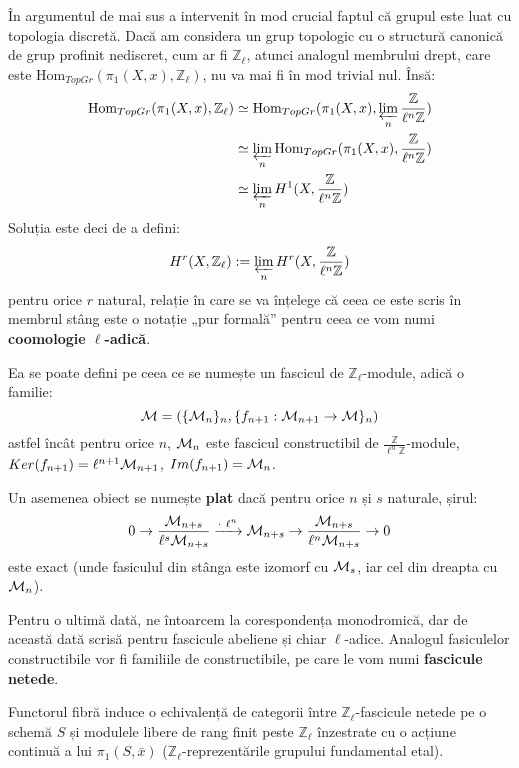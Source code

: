 \documentclass[13pt,openany]{book}
\begin{document}
În argumentul de mai sus a intervenit în mod crucial faptul că grupul este luat cu topologia discretă. Dacă am considera un grup topologic cu o structură canonică de grup profinit nediscret, cum ar fi $\mathbb{Z}_\ell$, atunci analogul membrului drept, care este $\text{Hom}_{TopGr}(\pi_1(X,x),\mathbb{Z}_\ell)$, nu va mai fi în mod trivial nul. Însă:
\begin{align*}
\text{Hom}_{TopGr}(\pi_1(X,x),\mathbb{Z}_\ell)&\simeq \text{Hom}_{TopGr}(\pi_1(X,x),\varprojlim_n \frac{\mathbb{Z}}{\ell^n\mathbb{Z}}) \\
&\simeq \varprojlim_n \text{Hom}_{TopGr}(\pi_1(X,x), \frac{\mathbb{Z}}{\ell^n\mathbb{Z}}) \\
&\simeq \varprojlim_n H^1(X, \frac{\mathbb{Z}}{\ell^n\mathbb{Z}}) \\
\end{align*}
Soluția este deci de a defini:
$$H^r(X,\mathbb{Z}_\ell):=\varprojlim_n H^r(X, \frac{\mathbb{Z}}{\ell^n\mathbb{Z}})$$
pentru orice $r$ natural, relație în care se va înțelege că ceea ce este scris în membrul stâng este o notație „pur formală” pentru ceea ce vom numi {\bf coomologie $\ell$-adică}.

Ea se poate defini pe ceea ce se numește un fascicul de $\mathbb{Z}_\ell$-module, adică o familie:
$$\mathcal{M}=(\{\mathcal{M}_n\}_n,\{f_{n+1}:\mathcal{M}_{n+1}\rightarrow\mathcal{M}\}_n)$$
astfel încât pentru orice $n$, $\mathcal{M}_n$ este fascicul constructibil de $\frac{\mathbb{Z}}{\ell^n\mathbb{Z}}$-module, $Ker(f_{n+1})=\ell^{n+1}\mathcal{M}_{n+1}$, $Im(f_{n+1})=\mathcal{M}_n$.

Un asemenea obiect se numește {\bf plat} dacă pentru orice $n$ și $s$ naturale, șirul:
$$0 \rightarrow \frac{\mathcal{M}_{n+s}}{\ell^s\mathcal{M}_{n+s}} \xrightarrow{\cdot\ \ell^n} \mathcal{M}_{n+s} \rightarrow \frac{\mathcal{M}_{n+s}}{\ell^n\mathcal{M}_{n+s}} \rightarrow 0$$
este exact (unde fasiculul din stânga este izomorf cu $\mathcal{M}_s$, iar cel din dreapta cu $\mathcal{M}_n$).

Pentru o ultimă dată, ne întoarcem la corespondența monodromică, dar de această dată scrisă pentru fascicule abeliene și chiar $\ell$-adice. Analogul fasiculelor constructibile vor fi familiile de constructibile, pe care le vom numi {\bf fascicule netede}.

\begin{teo}
Functorul fibră induce o echivalență de categorii între $\mathbb{Z}_\ell$-fascicule netede pe o schemă $S$ și modulele libere de rang finit peste $\mathbb{Z}_\ell$ înzestrate cu o acțiune continuă a lui $\pi_1(S,\bar{x})$ ($\mathbb{Z}_\ell$-reprezentările grupului fundamental etal).
\end{teo}
\end{document}
